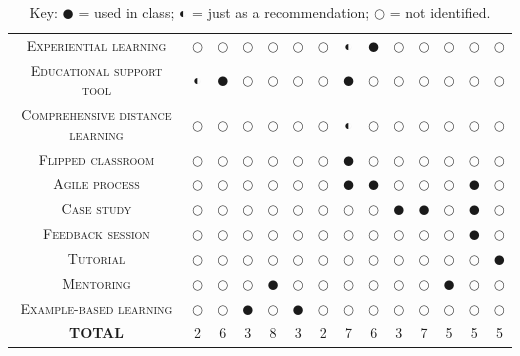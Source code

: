 \documentclass[10pt,conference]{IEEEtran}
\begin{document}
\begin{table}[ht]
\begin{tabular}{|cccccccccccccc|}
\textsc{Experiential learning}           & $\Circle$ & $\Circle$ & $\Circle$ & $\Circle$ & $\Circle$ & $\Circle$ & $\LEFTcircle$ & $\CIRCLE$ & $\Circle$ & $\Circle$ & $\Circle$ & $\Circle$ & $\Circle$  \\
\textsc{Educational support tool}        & $\LEFTcircle$ & $\CIRCLE$ & $\Circle$ & $\Circle$ & $\Circle$ & $\Circle$ & $\CIRCLE$ & $\Circle$ & $\Circle$ & $\Circle$ & $\Circle$ & $\Circle$ & $\Circle$  \\
\textsc{Comprehensive distance learning} & $\Circle$ & $\Circle$ & $\Circle$ & $\Circle$ & $\Circle$ & $\Circle$ & $\LEFTcircle$ & $\Circle$ & $\Circle$ & $\Circle$ & $\Circle$ & $\Circle$ & $\Circle$  \\
\textsc{Flipped classroom}               & $\Circle$ & $\Circle$ & $\Circle$ & $\Circle$ & $\Circle$ & $\Circle$ & $\CIRCLE$ & $\Circle$ & $\Circle$ & $\Circle$ & $\Circle$ & $\Circle$ & $\Circle$  \\
\textsc{Agile process}                   & $\Circle$ & $\Circle$ & $\Circle$ & $\Circle$ & $\Circle$ & $\Circle$ & $\CIRCLE$ & $\CIRCLE$ & $\Circle$ & $\Circle$ & $\Circle$ & $\CIRCLE$ & $\Circle$  \\
\textsc{Case study}                      & $\Circle$ & $\Circle$ & $\Circle$ & $\Circle$ & $\Circle$ & $\Circle$ & $\Circle$ & $\Circle$ & $\CIRCLE$ & $\CIRCLE$ & $\Circle$ & $\CIRCLE$ & $\Circle$  \\
\textsc{Feedback session}                & $\Circle$ & $\Circle$ & $\Circle$ & $\Circle$ & $\Circle$ & $\Circle$ & $\Circle$ & $\Circle$ & $\Circle$ & $\Circle$ & $\Circle$ & $\CIRCLE$ & $\Circle$  \\
\textsc{Tutorial}                        & $\Circle$ & $\Circle$ & $\Circle$ & $\Circle$ & $\Circle$ & $\Circle$ & $\Circle$ & $\Circle$ & $\Circle$ & $\Circle$ & $\Circle$ & $\Circle$ & $\CIRCLE$  \\ 
\textsc{Mentoring}                        & $\Circle$ & $\Circle$ & $\Circle$ & $\CIRCLE$ & $\Circle$ & $\Circle$ & $\Circle$ & $\Circle$ & $\Circle$ & $\Circle$ & $\CIRCLE$ & $\Circle$ & $\Circle$  \\ 
\textsc{Example-based learning}                        & $\Circle$ & $\Circle$ & $\CIRCLE$ & $\Circle$ & $\CIRCLE$ & $\Circle$ & $\Circle$ & $\Circle$ & $\Circle$ & $\Circle$ & $\Circle$ & $\Circle$ & $\Circle$  \\ 
\hline
\textbf{\textsc{TOTAL}}                  & 2          & 6          & 3          & 8          & 3          & 2          & 7          & 6          & 3          & 7          & 5          & 5          & 5           \\
\hline
\end{tabular}
\caption*{Key: $\CIRCLE$ =  used in class; $\LEFTcircle$ = just as a recommendation; $\Circle$ = not identified.}
\end{table}
\end{document}

